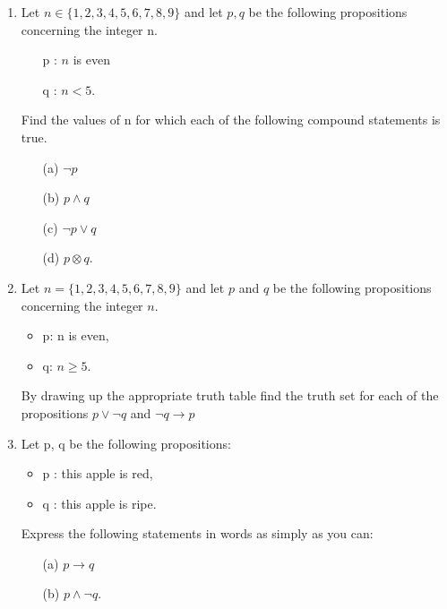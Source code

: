 \documentclass[12pt]{article}
\begin{document}
\begin{enumerate}
\item Let $n \in \{1,2,3,4,5,6,7, 8 ,9\}$ and let $p,q$ be the following propositions concerning the integer n.

\begin{itemize}
\item[p]: $n$ is even
\item[q]: $n < 5$.
\end{itemize}

Find the values of n for which each of the following compound statements is
true.
\begin{multicols}{2}
\begin{itemize}
\item[(a)] $\neg p$
\item[(b)] $p \wedge q$
\item[(c)] $\neg p \vee q$
\item[(d)] $ p \otimes q$.
\end{itemize}
\end{multicols}




\item 
Let $n = \{1, 2,3,4, 5,6,7, 8, 9\}$ and let $p$ and  $q$ be the following propositions concerning the integer $n$.
\begin{itemize}
\item p: n is even, 
\item q: $n\geq 5$.
\end{itemize}
By drawing up the appropriate truth table ﬁnd the truth set for each of the
propositions $p \vee \neg q$ and $ \neg q \rightarrow p$




\item 
Let p, q be the following propositions:
\begin{itemize}
\item p : this apple is red, 
\item q : this apple is ripe.
\end{itemize}

Express the following statements in words as simply as you can:
\begin{itemize}
\item[(a)] $p \rightarrow q$
\item[(b)] $p \wedge \neg q$.
\end{itemize}


\end{enumerate}
\end{document}
